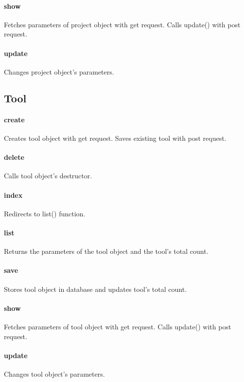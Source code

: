 \documentclass[12pt]{article}
\begin{document}
\paragraph{show} Fetches parameters of project object with get request. Calls update() with post request.
\paragraph{update} Changes project object's parameters.

\subsection{Tool}\label{sec:CTool}
\paragraph{create} Creates tool object with get request. Saves existing tool with post request.
\paragraph{delete} Calls tool object's destructor.
\paragraph{index} Redirects to list() function.
\paragraph{list} Returns the parameters of the tool object and the tool's total count.
\paragraph{save} Stores tool object in database and updates tool's total count.
\paragraph{show} Fetches parameters of tool object with get request. Calls update() with post request.
\paragraph{update} Changes tool object's parameters.
\end{document}
